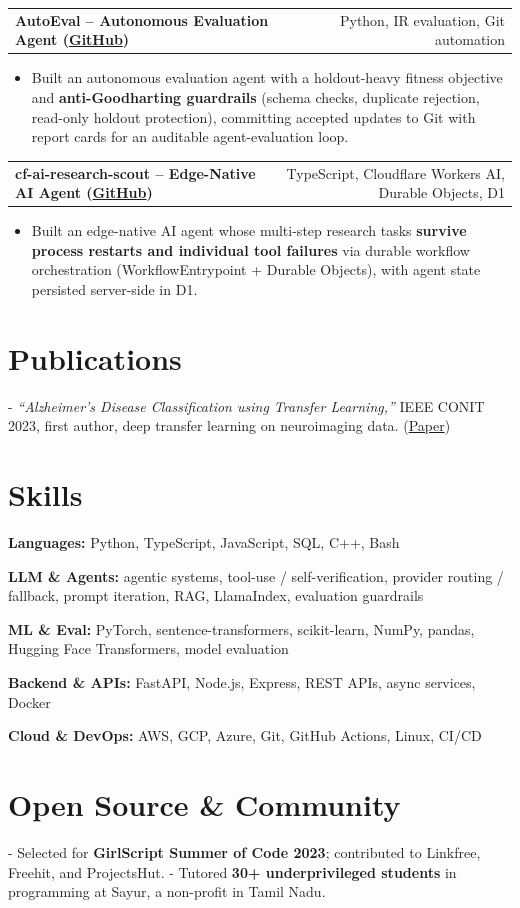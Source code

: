 \documentclass[letterpaper,11pt]{article}
\makeatletter
\newcommand{\projItem}[2]{%
  \vspace{2pt}
  \begin{tabular*}{\textwidth}{@{}l@{\extracolsep{\fill}}r@{}}
    \textbf{#1} & #2 \\
  \end{tabular*}\par\vspace{-3pt}
}
\newcommand{\skillLine}[2]{\textbf{#1:} #2\par\vspace{1.5pt}}
\newcommand{\inlineBlock}[1]{{\setlength{\leftskip}{0.18in}\small #1\par}}
\makeatother
\begin{document}
\projItem{AutoEval -- Autonomous Evaluation Agent {\normalfont\small(\href{https://github.com/Deva-1903/AutoEval}{GitHub})}}{Python, IR evaluation, Git automation}
\begin{itemize}
  \item Built an autonomous evaluation agent with a holdout-heavy fitness objective and \textbf{anti-Goodharting guardrails} (schema checks, duplicate rejection, read-only holdout protection), committing accepted updates to Git with report cards for an auditable agent-evaluation loop.
\end{itemize}

\projItem{cf-ai-research-scout -- Edge-Native AI Agent {\normalfont\small(\href{https://github.com/Deva-1903/cf_ai_research_scout}{GitHub})}}{TypeScript, Cloudflare Workers AI, Durable Objects, D1}
\begin{itemize}
  \item Built an edge-native AI agent whose multi-step research tasks \textbf{survive process restarts and individual tool failures} via durable workflow orchestration (WorkflowEntrypoint + Durable Objects), with agent state persisted server-side in D1.
\end{itemize}

\section{Publications}
\vspace{2pt}
\inlineBlock{- \textit{``Alzheimer's Disease Classification using Transfer Learning,''} IEEE CONIT 2023, first author, deep transfer learning on neuroimaging data. {\normalfont\small(\href{https://ieeexplore.ieee.org/document/10205760}{Paper})}}

\section{Skills}
\skillLine{Languages}{Python, TypeScript, JavaScript, SQL, C++, Bash}
\skillLine{LLM \& Agents}{agentic systems, tool-use / self-verification, provider routing / fallback, prompt iteration, RAG, LlamaIndex, evaluation guardrails}
\skillLine{ML \& Eval}{PyTorch, sentence-transformers, scikit-learn, NumPy, pandas, Hugging Face Transformers, model evaluation}
\skillLine{Backend \& APIs}{FastAPI, Node.js, Express, REST APIs, async services, Docker}
\skillLine{Cloud \& DevOps}{AWS, GCP, Azure, Git, GitHub Actions, Linux, CI/CD}

\section{Open Source \& Community}
\inlineBlock{- Selected for \textbf{GirlScript Summer of Code 2023}; contributed to Linkfree, Freehit, and ProjectsHut. - Tutored \textbf{30+ underprivileged students} in programming at Sayur, a non-profit in Tamil Nadu.}
\end{document}
